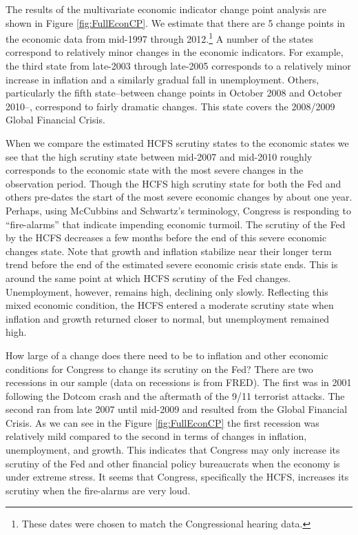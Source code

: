 \documentclass[a4paper]{article}\usepackage[]{graphicx}\usepackage[]{color}
\begin{document}
The results of the multivariate economic indicator change point analysis are shown in Figure \ref{fig:FullEconCP}. We estimate that there are 5 change points in the economic data from mid-1997 through 2012.\footnote{These dates were chosen to match the Congressional hearing data.} A number of the states correspond to relatively minor changes in the economic indicators. For example, the third state from late-2003 through late-2005 corresponds to a relatively minor increase in inflation and a similarly gradual fall in unemployment. Others, particularly the fifth state--between change points in October 2008 and October 2010--, correspond to fairly dramatic changes. This state covers the 2008/2009 Global Financial Crisis.

When we compare the estimated HCFS scrutiny states to the economic states we see that the high scrutiny state between mid-2007 and mid-2010 roughly corresponds to the economic state with the most severe changes in the observation period. Though the HCFS high scrutiny state for both the Fed and others pre-dates the start of the most severe economic changes by about one year. Perhaps, using McCubbins and Schwartz's \citeyearpar{Mccubbins1984} terminology, Congress is responding to ``fire-alarms'' that indicate impending economic turmoil. The scrutiny of the Fed by the HCFS decreases a few months before the end of this severe economic changes state. Note that growth and inflation stabilize near their longer term trend before the end of the estimated severe economic crisis state ends. This is around the same point at which HCFS scrutiny of the Fed changes. Unemployment, however, remains high, declining only slowly. Reflecting this mixed economic condition, the HCFS entered a moderate scrutiny state when inflation and growth returned closer to normal, but unemployment remained high.

How large of a change does there need to be to inflation and other economic conditions for Congress to change its scrutiny on the Fed? There are two recessions in our sample (data on recessions is from FRED). The first was in 2001 following the Dotcom crash and the aftermath of the 9/11 terrorist attacks. The second ran from late 2007 until mid-2009 and resulted from the Global Financial Crisis. As we can see in the Figure \ref{fig:FullEconCP} the first recession was relatively mild compared to the second in terms of changes in inflation, unemployment, and growth. This indicates that Congress may only increase its scrutiny of the Fed and other financial policy bureaucrats when the economy is under extreme stress. It seems that Congress, specifically the HCFS, increases its scrutiny when the fire-alarms are very loud.
\end{document}
